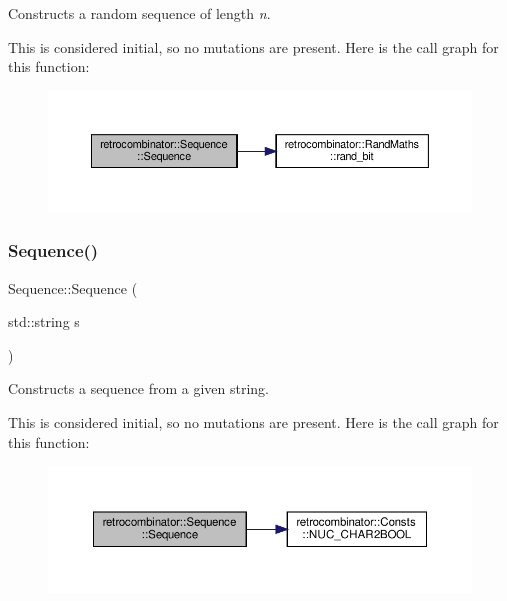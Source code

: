 Constructs a random sequence of length {\itshape n}. 

This is considered initial, so no mutations are present. Here is the call graph for this function\+:
\nopagebreak
\begin{figure}[H]
\begin{center}
\leavevmode
\includegraphics[width=350pt]{classretrocombinator_1_1Sequence_a04d0d6977316f2ab30844e584c4531ec_cgraph}
\end{center}
\end{figure}
\mbox{\label{classretrocombinator_1_1Sequence_af5b3b62eba07f0e09f532fcf1681c289}} 
\subsubsection{\texorpdfstring{Sequence()}{Sequence()}\hspace{0.1cm}{\footnotesize\ttfamily [2/3]}}
{\footnotesize\ttfamily Sequence\+::\+Sequence (\begin{DoxyParamCaption}\item[{std\+::string}]{s }\end{DoxyParamCaption})}



Constructs a sequence from a given string. 

This is considered initial, so no mutations are present. Here is the call graph for this function\+:
\nopagebreak
\begin{figure}[H]
\begin{center}
\leavevmode
\includegraphics[width=350pt]{classretrocombinator_1_1Sequence_af5b3b62eba07f0e09f532fcf1681c289_cgraph}
\end{center}
\end{figure}
\mbox{\label{classretrocombinator_1_1Sequence_af334c44bea806196b5037e61b0e831b1}} 
